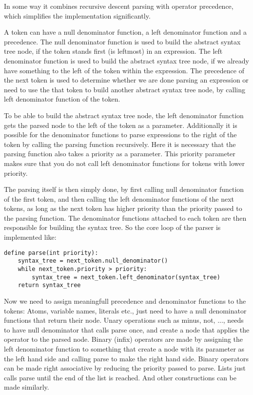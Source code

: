 In some way it combines recursive descent parsing with operator precedence, which simplifies the implementation significantly.

A token can have a null denominator function, a left denominator function and a precedence.
The null denominator function is used to build the abstract syntax tree node, if the token stands first (is leftmost) in an expression.
The left denominator function is used to build the abstract syntax tree node, if we already have something to the left of the token within the expression.
The precedence of the next token is used to determine whether we are done parsing an expression or need to use the that token to build another abstract syntax tree node, by calling left denominator function of the token.

To be able to build the abstract syntax tree node, the left denominator function gets the parsed node to the left of the token as a parameter. Additionally it is possible for the denominator functions to parse expressions to the right of the token by calling the parsing function recursively. Here it is necessary that the parsing function also takes a priority as a parameter. This priority parameter makes sure that you do not call left denominator functions for tokens with lower priority.

The parsing itself is then simply done, by first calling null denominator function of the first token, and then calling the left denominator functions of the next tokens, as long as the next token has higher priority than the priority passed to the parsing function.
The denominator functions attached to each token are then responsible for building the syntax tree.
So the core loop of the parser is implemented like:
\begin{verbatim}
define parse(int priority):
    syntax_tree = next_token.null_denominator()
    while next_token.priority > priority:
        syntax_tree = next_token.left_denominator(syntax_tree)
    return syntax_tree
\end{verbatim}

Now we need to assign meaningfull precedence and denominator functions to the tokens:
Atoms, variable names, literals etc., just need to have a null denominator functions that return their node. Unary operations such as minus, not, ..., needs to have null denominator that calls parse once, and create a node that applies the operator to the parsed node.
Binary (infix) operators are made by assigning the left denominator function to something that create a node with its parameter as the left hand side and calling parse to make the right hand side. Binary operators can be made right associative by reducing the priority passed to parse.
Lists just calls parse until the end of the list is reached. And other constructions can be made similarly. 

